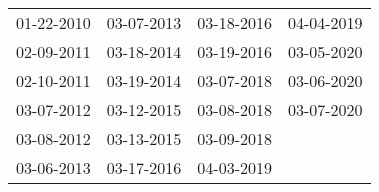 \begin{supertabular}{llll}
 01-22-2010 &  03-07-2013 &  03-18-2016 &  04-04-2019 \\
 02-09-2011 &  03-18-2014 &  03-19-2016 &  03-05-2020 \\
 02-10-2011 &  03-19-2014 &  03-07-2018 &  03-06-2020 \\
 03-07-2012 &  03-12-2015 &  03-08-2018 &  03-07-2020 \\
 03-08-2012 &  03-13-2015 &  03-09-2018 &             \\
 03-06-2013 &  03-17-2016 &  04-03-2019 &             \\
\end{supertabular}

